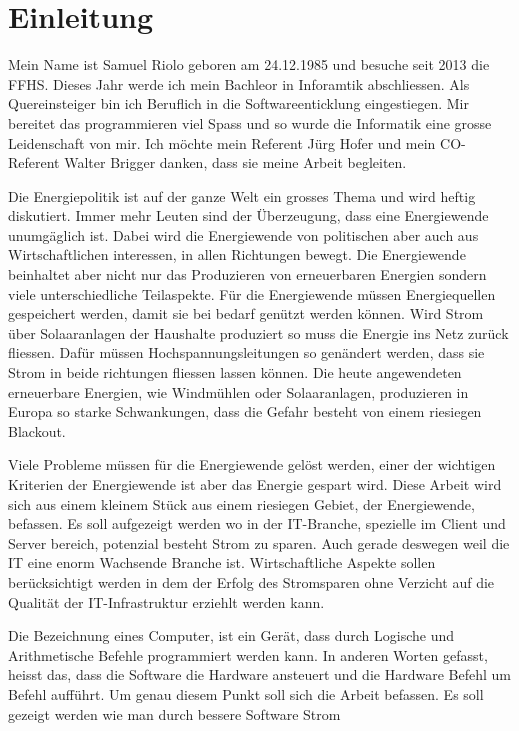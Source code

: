 \chapter{Einleitung}

Mein Name ist Samuel Riolo geboren am 24.12.1985 und besuche seit 2013 die FFHS. Dieses Jahr werde ich mein Bachleor in Inforamtik
abschliessen. Als Quereinsteiger bin ich Beruflich in die Softwareenticklung eingestiegen. Mir bereitet das
programmieren viel Spass und so wurde die Informatik eine grosse Leidenschaft von mir. Ich möchte mein Referent Jürg
Hofer und mein CO-Referent Walter Brigger danken, dass sie meine Arbeit begleiten.
\par
Die Energiepolitik ist auf der ganze Welt ein grosses Thema und wird heftig diskutiert. Immer mehr Leuten
sind der Überzeugung, dass eine Energiewende unumgäglich ist. Dabei wird die Energiewende von politischen aber auch
aus Wirtschaftlichen interessen, in allen Richtungen bewegt. Die Energiewende beinhaltet aber nicht nur
das Produzieren von erneuerbaren Energien sondern viele unterschiedliche Teilaspekte. Für die Energiewende
müssen Energiequellen gespeichert werden, damit sie bei bedarf genützt werden können. Wird Strom über
Solaaranlagen der Haushalte produziert so muss die Energie ins Netz zurück fliessen. Dafür müssen
Hochspannungsleitungen so genändert werden, dass sie Strom in beide richtungen fliessen lassen  können.
Die heute angewendeten erneuerbare Energien, wie Windmühlen oder Solaaranlagen, produzieren in Europa so starke
Schwankungen, dass die Gefahr besteht von einem riesiegen Blackout.
\par
Viele Probleme müssen für die Energiewende gelöst werden, einer der wichtigen Kriterien der Energiewende ist aber
das Energie gespart wird. Diese Arbeit wird sich aus einem kleinem Stück aus einem riesiegen Gebiet, der Energiewende,
befassen. Es soll aufgezeigt werden wo in der IT-Branche, spezielle im Client und Server bereich, potenzial besteht
Strom zu sparen. Auch gerade deswegen weil die IT eine enorm Wachsende Branche ist. Wirtschaftliche Aspekte sollen
berücksichtigt werden in dem der Erfolg des Stromsparen ohne Verzicht auf die Qualität der IT-Infrastruktur erziehlt
werden kann. 
\par
Die Bezeichnung eines Computer, ist ein Gerät, dass durch Logische und Arithmetische Befehle programmiert werden kann. In
anderen Worten gefasst, heisst das, dass die Software die Hardware ansteuert und die Hardware Befehl um Befehl aufführt.
Um genau diesem Punkt soll sich die Arbeit befassen. Es soll gezeigt werden wie man durch bessere Software Strom
